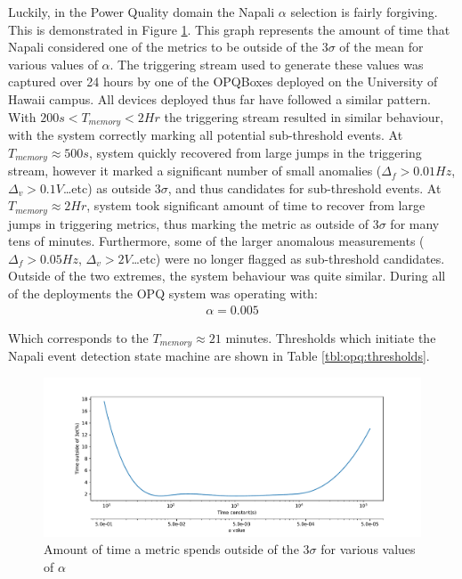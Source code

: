 Luckily, in the Power Quality domain the Napali $\alpha$ selection is fairly forgiving.
This is demonstrated in Figure \ref{fig:expdes:6}.
This graph represents the amount of time that Napali considered one of the metrics to be outside of the $3\sigma$ of the mean for various values of $\alpha$.
The triggering stream used to generate these values was captured over 24 hours by one of the OPQBoxes deployed on the University of Hawaii campus.
All devices deployed thus far have followed a similar pattern.
With $200s <T_{memory} < 2Hr$ the triggering stream resulted in similar behaviour, with the system correctly marking all potential sub-threshold events.
At $T_{memory} \approx 500s$, system quickly recovered from large jumps in the triggering stream, however it marked a significant number of small anomalies ($\Delta_{f}>0.01Hz$, $\Delta_{v}> 0.1V$\ldots etc) as outside $3\sigma$, and thus candidates for sub-threshold events.
At $T_{memory} \approx 2Hr$, system took  significant amount of time to recover from large jumps in triggering metrics, thus marking the metric as outside of $3\sigma$ for many tens of minutes.
Furthermore, some of the larger anomalous measurements ($\Delta_{f}>0.05Hz$, $\Delta_{v}> 2V$\ldots etc) were no longer flagged as sub-threshold candidates.
Outside of the two extremes, the system behaviour was quite similar.
During all of the deployments the OPQ system was operating with:
\begin{equation}\label{eq:opq_alpha}
\begin{aligned}
    \alpha = 0.005
\end{aligned}
\end{equation}


Which corresponds to the $T_{memory} \approx 21$ minutes.
Thresholds which initiate the Napali event detection state machine are shown in Table \ref{tbl:opq:thresholds}.

\begin{figure}[h]
    \centering
        \includegraphics[width=1\linewidth]{img/napali_eval/a_selection.pdf}
    \caption{Amount of time a metric spends outside of the $3\sigma$ for various values of $\alpha$}
    \label{fig:expdes:6}
\end{figure}

